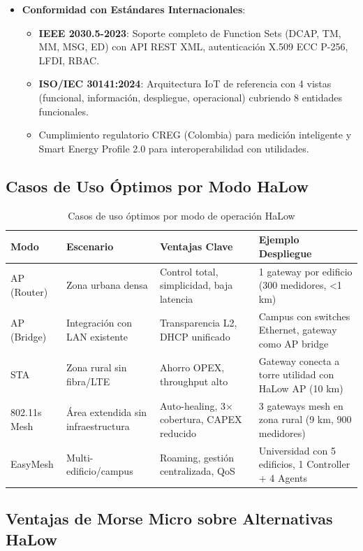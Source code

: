 \begin{itemize}
    \item \textbf{Conformidad con Estándares Internacionales}:
    \begin{itemize}
        \item \textbf{IEEE 2030.5-2023}: Soporte completo de Function Sets (DCAP, TM, MM, MSG, ED) con API REST XML, autenticación X.509 ECC P-256, LFDI, RBAC.
        \item \textbf{ISO/IEC 30141:2024}: Arquitectura IoT de referencia con 4 vistas (funcional, información, despliegue, operacional) cubriendo 8 entidades funcionales.
        \item Cumplimiento regulatorio CREG (Colombia) para medición inteligente y Smart Energy Profile 2.0 para interoperabilidad con utilidades.
    \end{itemize}
\end{itemize}

\subsection{Casos de Uso Óptimos por Modo HaLow}

\begin{table}[h]
\centering
\small
\begin{tabular}{|l|p{3cm}|p{4cm}|p{4cm}|}
\hline
\textbf{Modo} & \textbf{Escenario} & \textbf{Ventajas Clave} & \textbf{Ejemplo Despliegue} \\
\hline
AP (Router) & Zona urbana densa & Control total, simplicidad, baja latencia & 1 gateway por edificio (300 medidores, <1 km) \\
\hline
AP (Bridge) & Integración con LAN existente & Transparencia L2, DHCP unificado & Campus con switches Ethernet, gateway como AP bridge \\
\hline
STA & Zona rural sin fibra/LTE & Ahorro OPEX, throughput alto & Gateway conecta a torre utilidad con HaLow AP (10 km) \\
\hline
802.11s Mesh & Área extendida sin infraestructura & Auto-healing, 3$\times$ cobertura, CAPEX reducido & 3 gateways mesh en zona rural (9 km, 900 medidores) \\
\hline
EasyMesh & Multi-edificio/campus & Roaming, gestión centralizada, QoS & Universidad con 5 edificios, 1 Controller + 4 Agents \\
\hline
\end{tabular}
\caption{Casos de uso óptimos por modo de operación HaLow}
\end{table}

\subsection{Ventajas de Morse Micro sobre Alternativas HaLow}

